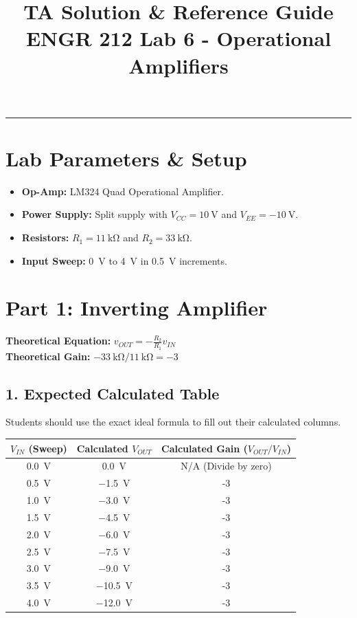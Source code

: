 \documentclass[11pt]{article}
\title{\vspace{-1in}\textbf{TA Solution \& Reference Guide} \\ \Large ENGR 212 Lab 6 - Operational Amplifiers}
\author{}
\date{}
\begin{document}
\maketitle
\vspace{-0.5in}
\hrule
\vspace{0.2in}

\section*{Lab Parameters \& Setup}
\begin{itemize}
  \item \textbf{Op-Amp:} LM324 Quad Operational Amplifier.
  \item \textbf{Power Supply:} Split supply with $V_{CC} = \SI{+10}{\volt}$ and $V_{EE} = \SI{-10}{\volt}$.
  \item \textbf{Resistors:} $R_1 = \SI{11}{\kilo\ohm}$ and $R_2 = \SI{33}{\kilo\ohm}$.
  \item \textbf{Input Sweep:} \SI{0}{\volt} to \SI{4}{\volt} in \SI{0.5}{\volt} increments.
\end{itemize}

\vspace{0.2in}
\section*{Part 1: Inverting Amplifier}

\textbf{Theoretical Equation:} $v_{OUT} = -\frac{R_2}{R_1}v_{IN}$ \\
\textbf{Theoretical Gain:} $-\SI{33}{\kilo\ohm} / \SI{11}{\kilo\ohm} = -3$

\subsection*{1. Expected Calculated Table}
Students should use the exact ideal formula to fill out their calculated columns.

\begin{table}[H]
  \centering
  \begin{tabular}{ccc}
    \toprule
    \textbf{$V_{IN}$ (Sweep)} & \textbf{Calculated $V_{OUT}$} & \textbf{Calculated Gain ($V_{OUT}/V_{IN}$)} \\
    \midrule
    \SI{0.0}{\volt} & \SI{0.0}{\volt} & N/A (Divide by zero) \\
    \SI{0.5}{\volt} & \SI{-1.5}{\volt} & -3 \\
    \SI{1.0}{\volt} & \SI{-3.0}{\volt} & -3 \\
    \SI{1.5}{\volt} & \SI{-4.5}{\volt} & -3 \\
    \SI{2.0}{\volt} & \SI{-6.0}{\volt} & -3 \\
    \SI{2.5}{\volt} & \SI{-7.5}{\volt} & -3 \\
    \SI{3.0}{\volt} & \SI{-9.0}{\volt} & -3 \\
    \SI{3.5}{\volt} & \SI{-10.5}{\volt} & -3 \\
    \SI{4.0}{\volt} & \SI{-12.0}{\volt} & -3 \\
    \bottomrule
  \end{tabular}
\end{table}
\end{document}
